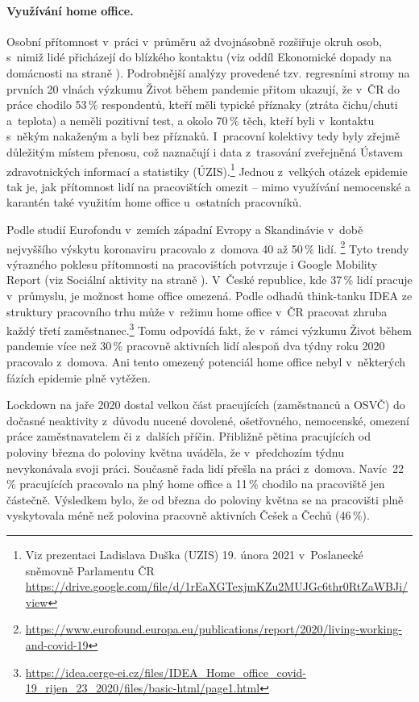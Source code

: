 \paragraph{Využívání home office.} Osobní přítomnost v práci v průměru až dvojnásobně rozšiřuje okruh osob, s nimiž lidé přicházejí do blízkého kontaktu (viz oddíl Ekonomické dopady na domácnosti na straně \pageref{Ekonomicke_dopady}). Podrobnější analýzy provedené tzv. regresními stromy na prvních 20 vlnách výzkumu Život během pandemie přitom ukazují, že v ČR do práce chodilo 53\,\% respondentů, kteří měli typické příznaky (ztráta čichu/chuti a teplota) a neměli pozitivní test, a okolo 70\,\% těch, kteří byli v kontaktu s někým nakaženým a byli bez příznaků. I~pracovní kolektivy tedy byly zřejmě důležitým místem přenosu, což naznačují i data z trasování zveřejněná Ústavem zdravotnických informací a statistiky (ÚZIS).\footnote{Viz prezentaci Ladislava Duška (UZIS) 19. února 2021 v~Poslanecké sněmovně Parlamentu ČR \url{https://drive.google.com/file/d/1rEaXGTexjmKZu2MUJGc6thr0RtZaWBJi/view}} Jednou z velkých otázek epidemie tak je, jak přítomnost lidí na pracovištích omezit – mimo využívání nemocenské a karantén také využitím home office u~ostatních pracovníků.

Podle studií Eurofondu v zemích západní Evropy a Skandinávie v době nejvyššího výskytu koronaviru pracovalo z domova 40 až 50\,\% lidí. \footnote{ \url{https://www.eurofound.europa.eu/publications/report/2020/living-working-and-covid-19}} Tyto trendy výrazného poklesu přítomnosti na pracovištích potvrzuje i Google Mobility Report (viz Sociální aktivity na straně \pageref{Socialni_aktivity}). V České republice, kde 37\,\% lidí pracuje v průmyslu, je možnost home office omezená. Podle odhadů think-tanku IDEA ze struktury pracovního trhu může v~režimu home office v ČR pracovat zhruba každý třetí za\-měst\-na\-nec.\footnote{\url{https://idea.cerge-ei.cz/files/IDEA\_Home\_office\_covid-19\_rijen\_23\_2020/files/basic-html/page1.html}} Tomu odpovídá fakt, že v rámci výzkumu Život během pandemie více než 30\,\% pracovně aktivních lidí alespoň dva týdny roku 2020 pracovalo z domova. Ani tento omezený potenciál home office nebyl v některých fázích epidemie plně vytěžen.

Lockdown na jaře 2020 dostal velkou část pracujících (zaměstnanců a OSVČ) do dočasné neaktivity z důvodu nucené dovolené, ošetřovného, nemocenské, omezení práce zaměstnavatelem či z~dalších příčin. Přibližně pětina pracujících od poloviny března do poloviny května uváděla, že v~předchozím týdnu nevykonávala svoji práci. Současně řada lidí přešla na práci z domova. Navíc 22\,\% pracujících pracovalo na plný home office a 11\,\% chodilo na pracoviště jen částečně. Výsledkem bylo, že od března do poloviny května se na pracovišti plně vyskytovala méně než polovina pracovně aktivních Češek a Čechů (46\,\%).

